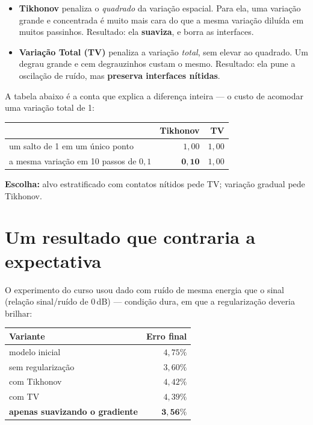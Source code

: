 \documentclass[11pt,a4paper,oneside]{report}
\begin{document}
\begin{itemize}[leftmargin=*]
\item \textbf{Tikhonov} penaliza o \emph{quadrado} da varia\c{c}\~ao espacial.
Para ela, uma varia\c{c}\~ao grande e concentrada \'e muito mais cara do que a
mesma varia\c{c}\~ao dilu\'ida em muitos passinhos. Resultado: ela
\textbf{suaviza}, e borra as interfaces.
\item \textbf{Varia\c{c}\~ao Total (TV)} penaliza a varia\c{c}\~ao
\emph{total}, sem elevar ao quadrado. Um degrau grande e cem degrauzinhos
custam o mesmo. Resultado: ela pune a oscila\c{c}\~ao de ru\'ido, mas
\textbf{preserva interfaces n\'itidas}.
\end{itemize}

A tabela abaixo \'e a conta que explica a diferen\c{c}a inteira --- o custo de
acomodar uma varia\c{c}\~ao total de 1:

\begin{center}
\begin{tabular}{@{}lrr@{}}
\toprule
 & \textbf{Tikhonov} & \textbf{TV} \\
\midrule
um salto de 1 em um \'unico ponto & $1{,}00$ & $1{,}00$ \\
a mesma varia\c{c}\~ao em 10 passos de $0{,}1$ & $\mathbf{0{,}10}$ & $1{,}00$ \\
\bottomrule
\end{tabular}
\end{center}

\textbf{Escolha:} alvo estratificado com contatos n\'itidos pede TV;
varia\c{c}\~ao gradual pede Tikhonov.

\section{Um resultado que contraria a expectativa}

O experimento do curso usou dado com ru\'ido de mesma energia que o sinal
(rela\c{c}\~ao sinal/ru\'ido de 0\,dB) --- condi\c{c}\~ao dura, em que a
regulariza\c{c}\~ao deveria brilhar:

\begin{center}
\begin{tabular}{@{}lr@{}}
\toprule
\textbf{Variante} & \textbf{Erro final} \\
\midrule
modelo inicial & $4{,}75\%$ \\
sem regulariza\c{c}\~ao & $3{,}60\%$ \\
com Tikhonov & $4{,}42\%$ \\
com TV & $4{,}39\%$ \\
\textbf{apenas suavizando o gradiente} & $\mathbf{3{,}56\%}$ \\
\bottomrule
\end{tabular}
\end{center}
\end{document}
